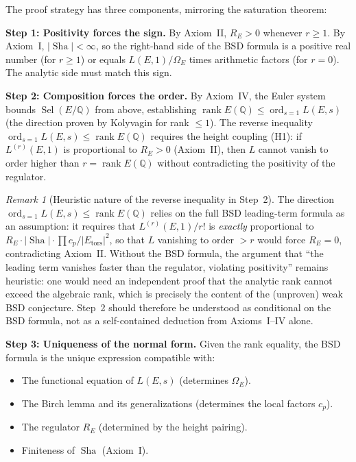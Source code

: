 \documentclass[aps,prd,twocolumn,superscriptaddress,nofootinbib]{revtex4-2}
\theoremstyle{definition}
\theoremstyle{remark}
\newtheorem{remark}[theorem]{Remark}
\DeclareMathOperator{\ord}{ord}
\DeclareMathOperator{\rank}{rank}
\DeclareMathOperator{\Sel}{Sel}
\DeclareMathOperator{\Sha}{Sha}
\begin{document}
The proof strategy has three components, mirroring the saturation theorem:

\textbf{Step 1: Positivity forces the sign.} By Axiom~II, $R_E > 0$ whenever $r \geq 1$. By Axiom~I, $|\Sha| < \infty$, so the right-hand side of the BSD formula is a positive real number (for $r \geq 1$) or equals $L(E,1)/\Omega_E$ times arithmetic factors (for $r = 0$). The analytic side must match this sign.

\textbf{Step 2: Composition forces the order.} By Axiom~IV, the Euler system bounds $\Sel(E/\mathbb{Q})$ from above, establishing $\rank E(\mathbb{Q}) \leq \ord_{s=1} L(E,s)$ (the direction proven by Kolyvagin for rank $\leq 1$). The reverse inequality $\ord_{s=1} L(E,s) \leq \rank E(\mathbb{Q})$ requires the height coupling (H1): if $L^{(r)}(E,1)$ is proportional to $R_E > 0$ (Axiom~II), then $L$ cannot vanish to order higher than $r = \rank E(\mathbb{Q})$ without contradicting the positivity of the regulator.

\begin{remark}[Heuristic nature of the reverse inequality in Step~2]
The direction $\ord_{s=1} L(E,s) \leq \rank E(\mathbb{Q})$ relies on the full BSD leading-term formula as an assumption: it requires that $L^{(r)}(E,1)/r!$ is \textit{exactly} proportional to $R_E \cdot |\Sha| \cdot \prod c_p / |E_{\mathrm{tors}}|^2$, so that $L$ vanishing to order $> r$ would force $R_E = 0$, contradicting Axiom~II. Without the BSD formula, the argument that ``the leading term vanishes faster than the regulator, violating positivity'' remains heuristic: one would need an independent proof that the analytic rank cannot exceed the algebraic rank, which is precisely the content of the (unproven) weak BSD conjecture. Step~2 should therefore be understood as conditional on the BSD formula, not as a self-contained deduction from Axioms~I--IV alone.
\end{remark}

\textbf{Step 3: Uniqueness of the normal form.} Given the rank equality, the BSD formula is the unique expression compatible with:
\begin{itemize}
\item The functional equation of $L(E,s)$ (determines $\Omega_E$).
\item The Birch lemma and its generalizations (determines the local factors $c_p$).
\item The regulator $R_E$ (determined by the height pairing).
\item Finiteness of $\Sha$ (Axiom~I).
\end{itemize}
\end{document}
